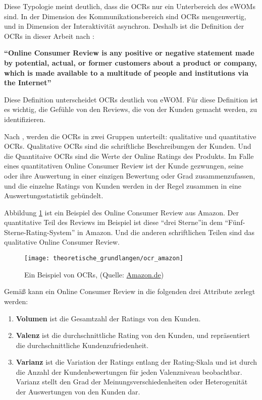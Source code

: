Diese Typologie meint deutlich, dass die \ac{OCRs} nur ein Unterbereich des \ac{eWOM}s sind. In der Dimension des Kommunikationsbereich sind \ac{OCRs} mengenwertig, und in Dimension der Interaktivität asynchron. Deshalb ist die Definition der \ac{OCRs} in dieser Arbeit nach \citet{Hennig-Thurau2004a}:

\textbf{``Online Consumer Review is any positive or negative statement made by potential, actual, or former customers about a product or company, which is made available to a multitude of people and institutions via the Internet''}

Diese Definition unterscheidet \acl{OCRs} deutlich von \ac{eWOM}. Für diese Definition ist es wichtig, die Gefühle von den Reviews, die von der Kunden gemacht werden, zu identifizieren. 

Nach \citet{Shrihari2012}, werden die \ac{OCRs} in zwei Gruppen unterteilt: qualitative und quantitative \ac{OCRs}. Qualitative \ac{OCRs} sind die schriftliche Beschreibungen der Kunden. Und die Quantitaive \ac{OCRs} sind die Werte der Online Ratings des Produkts. Im Falle eines quantitativen Online Consumer Review ist der Kunde gezwungen, seine oder ihre Auswertung in einer einzigen Bewertung oder Grad zusammenzufassen, und die einzelne Ratings von Kunden werden in der Regel zusammen in eine Auswertungsstatistik gebündelt. \citep{Kostyra2015}

Abbildung \ref{fig:beispiel_ocr} ist ein Beispiel des Online Consumer Review aus Amazon. Der quantitative Teil des Reviews im Beispiel ist diese ``drei Sterne''in dem ``Fünf-Sterne-Rating-System'' in Amazon. Und die anderen schriftlichen Teilen sind das qualitative Online Consumer Review.

\begin{figure}[htb]
	\begin{center}
		\texttt{[image: theoretische\_grundlangen/ocr\_amazon]}
		\caption[Ein Beispiel von OCRs]{Ein Beispiel von \ac{OCRs}, (Quelle: \href{http://www.amazon.de/}{Amazon.de})}
		\label{fig:beispiel_ocr}
	\end{center}
\end{figure}

Gemäß \citet{pradeep2010the} kann ein Online Consumer Review in die folgenden drei Attribute zerlegt werden:
\begin{enumerate}
	\item \textbf{Volumen} ist die Gesamtzahl der Ratings von den Kunden.
	\item \textbf{Valenz} ist die durchschnittliche Rating von den Kunden, und repräsentiert die durchschnittliche Kundenzufriedenheit.
	\item \textbf{Varianz} ist die Variation der Ratings entlang der Rating-Skala und ist durch die Anzahl der Kundenbewertungen für jeden Valenzniveau beobachtbar. Varianz stellt den Grad der Meinungsverschiedenheiten oder Heterogenität der Auswertungen von den Kunden dar.
\end{enumerate}
